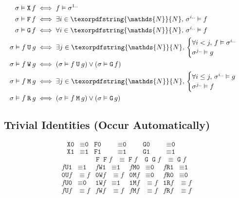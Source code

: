 \documentclass[a4paper,twoside,10pt,DIV=12,draft]{scrreprt}
\newcommand{\N}{\texorpdfstring{\ensuremath{\mathds{N}}}{N}}
\DeclareMathOperator{\F}{\texttt{F}}
\DeclareMathOperator{\G}{\texttt{G}}
\newcommand{\U}{\mathbin{\texttt{U}}}
\newcommand{\R}{\mathbin{\texttt{R}}}
\DeclareMathOperator{\X}{\texttt{X}}
\newcommand{\M}{\mathbin{\texttt{M}}}
\newcommand{\W}{\mathbin{\texttt{W}}}
\newcommand{\0}{\texttt{0}}
\newcommand{\1}{\texttt{1}}
\begin{document}
\begin{align*}
  \sigma\vDash \X f &\iff f\vDash \sigma^{1..}\\
  \sigma\vDash \F f &\iff \exists i\in \N,\, \sigma^{i..}\vDash f\\
  \sigma\vDash \G f &\iff \forall i\in \N,\, \sigma^{i..}\vDash f\\
  \sigma\vDash f\U g &\iff \exists j\in\N,\,
  \begin{cases}
    \forall i<j,\, f\vDash \sigma^{i..}\\
    \sigma^{j..} \vDash g\\
  \end{cases}\\
  \sigma \vDash f\W g &\iff (\sigma\vDash f\U g)\lor(\sigma\vDash\G f)\\
  \sigma \vDash f\M g &\iff \exists j\in\N,\,
  \begin{cases}
    \forall i\le j,\, \sigma^{i..}\vDash g\\
    \sigma^{j..}\vDash f\\
  \end{cases}\\
  \sigma \vDash f\R g &\iff (\sigma \vDash f\M g)\lor(\sigma\vDash \G g)
\end{align*}

\subsection{Trivial Identities (Occur Automatically)}

  \begin{align*}
    \X\0 &\equiv \0 &
    \F\0 &\equiv \0 &
    \G\0 &\equiv \0 \\
    \X\1 &\equiv \1 &
    \F\1 &\equiv \1 &
    \G\1 &\equiv \1 \\
               &                &
    \F\F f&\equiv \F f &
    \G\G f&\equiv \G f
  \end{align*}
  \begin{align*}
    f\U\1&\equiv \1 &
    f\W\1&\equiv \1 &
    f\M\0&\equiv \0 &
    f\R\1&\equiv \1 \\
    \0\U f&\equiv f &
    \0\W f&\equiv f &
    \0\M f&\equiv \0 &
    f\R\0&\equiv \0 \\
    f\U\0&\equiv \0 &
    \1\W f&\equiv \1 &
    \1\M f&\equiv f &
    \1\R f&\equiv f \\
    f\U f&\equiv f &
    f\W f&\equiv f &
    f\M f&\equiv f &
    f\R f&\equiv f
  \end{align*}
\end{document}
